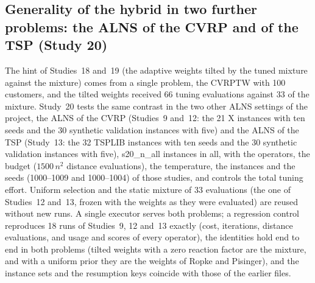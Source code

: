 \subsection{Generality of the hybrid in two further problems: the ALNS of the CVRP and of the TSP (Study 20)}\label{sec:s20design}
The hint of Studies~18 and~19 (the adaptive weights tilted by the tuned mixture against the mixture) comes from a single problem, the CVRPTW with 100 customers, and the tilted weights received 66 tuning evaluations against 33 of the mixture. Study~20 tests the same contrast in the two other ALNS settings of the project, the ALNS of the CVRP (Studies~9 and~12: the 21 X instances with ten seeds and the 30 synthetic validation instances with five) and the ALNS of the TSP (Study~13: the 32 TSPLIB instances with ten seeds and the 30 synthetic validation instances with five), \num{s20_n_all} instances in all, with the operators, the budget ($1500\,n^2$ distance evaluations), the temperature, the instances and the seeds (1000--1009 and 1000--1004) of those studies, and controls the total tuning effort. Uniform selection and the static mixture of 33 evaluations (the one of Studies~12 and~13, frozen with the weights as they were evaluated) are reused without new runs. A single executor serves both problems; a regression control reproduces 18 runs of Studies~9, 12 and~13 exactly (cost, iterations, distance evaluations, and usage and scores of every operator), the identities hold end to end in both problems (tilted weights with a zero reaction factor are the mixture, and with a uniform prior they are the weights of Ropke and Pisinger), and the instance sets and the resumption keys coincide with those of the earlier files.

